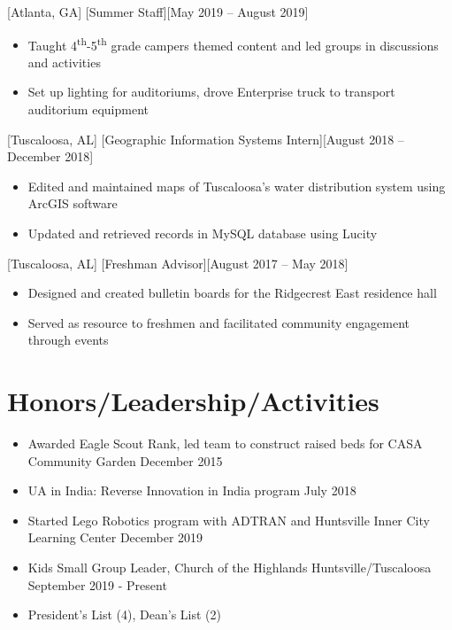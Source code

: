 \documentclass[hidelinks, 11pt]{article}
\begin{document}
[Atlanta, GA]
[Summer Staff][May 2019 – August 2019]

\begin{itemize}
  \item Taught 4\textsuperscript{th}-5\textsuperscript{th} grade campers themed content and led groups in discussions and activities
  \item Set up lighting for auditoriums, drove Enterprise truck to transport auditorium equipment
\end{itemize}

[Tuscaloosa, AL]
[Geographic Information Systems Intern][August 2018 – December 2018]

\begin{itemize}
  \item Edited and maintained maps of Tuscaloosa’s water distribution system using ArcGIS software
  \item Updated and retrieved records in MySQL database using Lucity
\end{itemize}

[Tuscaloosa, AL]
[Freshman Advisor][August 2017 – May 2018]

\begin{itemize}
  \item Designed and created bulletin boards for the Ridgecrest East residence hall
  \item Served as resource to freshmen and facilitated community engagement through events
\end{itemize}

\section{Honors/Leadership/Activities}

\begin{itemize}
  \item Awarded Eagle Scout Rank, led team to construct raised beds for CASA Community Garden \hfill December 2015
  \item UA in India: Reverse Innovation in India program \hfill July 2018
  \item Started Lego Robotics program with ADTRAN and Huntsville Inner City Learning Center \hfill December 2019
  \item Kids Small Group Leader, Church of the Highlands Huntsville/Tuscaloosa \hfill September 2019 - Present
  \item President's List (4), Dean's List (2)
\end{itemize}
\end{document}
